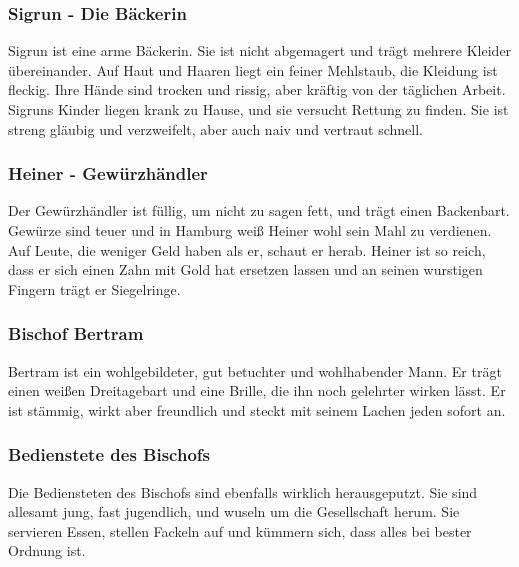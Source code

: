 \subsubsection*{Sigrun - Die Bäckerin}
\label{Sigrun}

Sigrun ist eine arme Bäckerin. Sie ist nicht abgemagert und trägt mehrere Kleider übereinander. Auf Haut und Haaren liegt ein feiner Mehlstaub, die Kleidung ist fleckig. Ihre Hände sind trocken und rissig, aber kräftig von der täglichen Arbeit. Sigruns Kinder liegen krank zu Hause, und sie versucht Rettung zu finden. Sie ist streng gläubig und verzweifelt, aber auch naiv und vertraut schnell.

\subsubsection*{Heiner - Gewürzhändler}
\label{Heiner}

Der Gewürzhändler ist füllig, um nicht zu sagen fett, und trägt einen Backenbart. Gewürze sind teuer und in Hamburg weiß Heiner wohl sein Mahl zu verdienen. Auf Leute, die weniger Geld haben als er, schaut er herab. Heiner ist so reich, dass er sich einen Zahn mit Gold hat ersetzen lassen und an seinen wurstigen Fingern trägt er Siegelringe.

\subsubsection*{Bischof Bertram}
\label{Bertram}

Bertram ist ein wohlgebildeter, gut betuchter und wohlhabender Mann. Er trägt einen weißen Dreitagebart und eine Brille, die ihn noch gelehrter wirken lässt. Er ist stämmig, wirkt aber freundlich und steckt mit seinem Lachen jeden sofort an.

\subsubsection*{Bedienstete des Bischofs}
\label{Bischofdiener}

Die Bediensteten des Bischofs sind ebenfalls wirklich herausgeputzt. Sie sind allesamt jung, fast jugendlich, und wuseln um die Gesellschaft herum. Sie servieren Essen, stellen Fackeln auf und kümmern sich, dass alles bei bester Ordnung ist.

